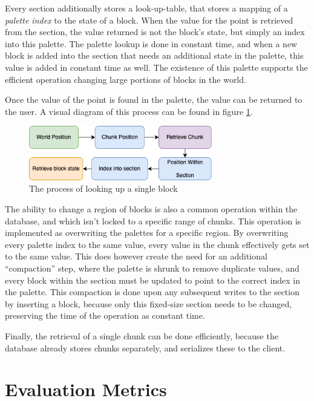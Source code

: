 \documentclass[10pt,twocolumn]{article}
\begin{document}
Every section additionally stores a look-up-table, that stores a mapping of a
\textit{palette index} to the state of a block. When the value for the point is
retrieved from the section, the value returned is not the block's state, but
simply an index into this palette. The palette lookup is done in constant time,
and when a new block is added into the section that needs an additional state in
the palette, this value is added in constant time as well. The existence of this
palette supports the efficient operation changing large portions of blocks in
the world.

Once the value of the point is found in the palette, the value can be returned
to the user. A visual diagram of this process can be found in figure
\ref{fig:lookup}.

\begin{figure}
  \centering
  \includegraphics[width=8cm]{block-search.drawio.png}
  \caption{The process of looking up a single block}
  \label{fig:lookup}
\end{figure}

The ability to change a region of blocks is also a common operation within the
database, and which isn't locked to a specific range of chunks. This operation
is implemented as overwriting the palettes for a specific region. By overwriting
every palette index to the same value, every value in the chunk effectively gets
set to the same value. This does however create the need for an additional
``compaction'' step, where the palette is shrunk to remove duplicate values, and
every block within the section must be updated to point to the correct index in
the palette. This compaction is done upon any subsequent writes to the section
by inserting a block, because only this fixed-size section needs to be changed,
preserving the time of the operation as constant time.

Finally, the retrieval of a single chunk can be done efficiently, because the
database already stores chunks separately, and serializes these to the client.


\section{Evaluation Metrics}
\end{document}
